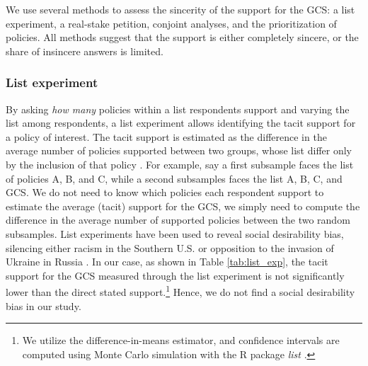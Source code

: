 We use several methods to assess the sincerity of the support for the GCS: a list experiment, a real-stake petition, conjoint analyses, and the prioritization of policies. All methods suggest that the support is either completely sincere, or the share of insincere answers is limited. 

\subsubsection{List experiment}\label{subsubsec:list_exp} %

By asking \textit{how many} policies within a list respondents support and varying the list among respondents, a list experiment allows identifying the tacit support for a policy of interest. The tacit support is estimated as the difference in the average number of policies supported between two groups, whose list differ only by the inclusion of that policy \citep{hainmueller_causal_2014}. %
For example, say a first subsample faces the list of policies A, B, and C, while a second subsamples faces the list A, B, C, and GCS. We do not need to know which policies each respondent support to estimate the average (tacit) support for the GCS, we simply need to compute the difference in the average number of supported policies between the two random subsamples. 
List experiments have been used to reveal social desirability bias, silencing either racism in the Southern U.S. \citep{kuklinski_racial_1997} or opposition to the invasion of Ukraine in Russia \citep{chapkovski_solid_2022}. %
In our case, as shown in Table \ref{tab:list_exp}, the tacit support for the GCS measured through the list experiment is not significantly lower than the direct stated support.\footnote{We utilize the difference-in-means estimator, and confidence intervals are computed using Monte Carlo simulation with the R package \textit{list} \citep{imai_multivariate_2011}.} Hence, we do not find a social desirability bias in our study.

